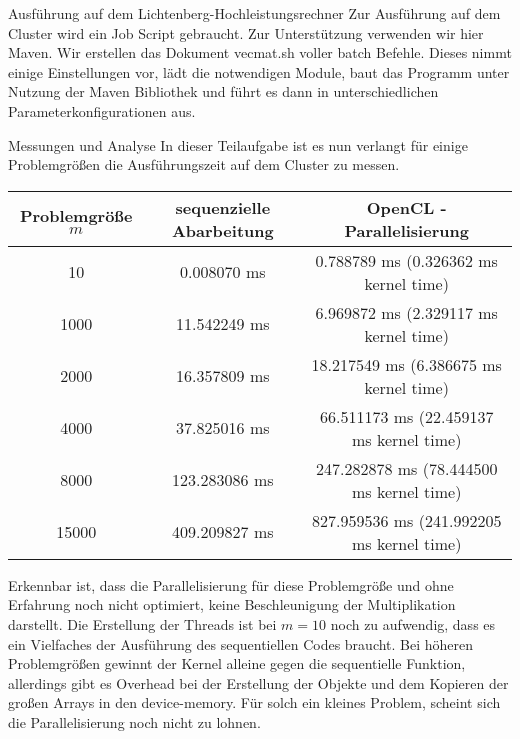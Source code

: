 \documentclass[
ngerman,
subtask=ruled %
]{tudaexercise}
\begin{document}
	
	\begin{task}{Ausführung auf dem Lichtenberg-Hochleistungsrechner} 
		Zur Ausführung auf dem Cluster wird ein Job Script gebraucht. Zur Unterstützung verwenden wir hier Maven.
		Wir erstellen das Dokument vecmat.sh voller batch Befehle.
		Dieses nimmt einige Einstellungen vor, lädt die notwendigen Module, baut das Programm unter Nutzung der Maven Bibliothek und führt es dann in unterschiedlichen Parameterkonfigurationen aus.
	\end{task}

	\begin{task}{Messungen und Analyse} 
		In dieser Teilaufgabe ist es nun verlangt für einige Problemgrößen die Ausführungszeit auf dem Cluster zu messen.
		
		\begin{tabular}{|c|c|c|}
			\hline
			Problemgröße $m$ & sequenzielle Abarbeitung & OpenCL - Parallelisierung \\
			\hline
			10 & 0.008070 ms & 0.788789 ms (0.326362 ms kernel time) \\
			\hline
			1000 & 11.542249 ms & 6.969872 ms (2.329117 ms kernel time) \\
			\hline
			2000 & 16.357809 ms & 18.217549 ms (6.386675 ms kernel time) \\
			\hline
			4000 & 37.825016 ms & 66.511173 ms (22.459137 ms kernel time) \\
			\hline
			8000 & 123.283086 ms & 247.282878 ms (78.444500 ms kernel time) \\
			\hline
			15000 & 409.209827 ms & 827.959536 ms (241.992205 ms kernel time) \\
			\hline
		\end{tabular}
	
		Erkennbar ist, dass die Parallelisierung für diese Problemgröße und ohne Erfahrung noch nicht optimiert, keine Beschleunigung der Multiplikation darstellt.
		Die Erstellung der Threads ist bei $m=10$ noch zu aufwendig, dass es ein Vielfaches der Ausführung des sequentiellen Codes braucht.
		Bei höheren Problemgrößen gewinnt der Kernel alleine gegen die sequentielle Funktion, allerdings gibt es Overhead bei der Erstellung der Objekte und dem Kopieren der großen Arrays in den device-memory.
		Für solch ein kleines Problem, scheint sich die Parallelisierung noch nicht zu lohnen.
	\end{task}
\end{document}
